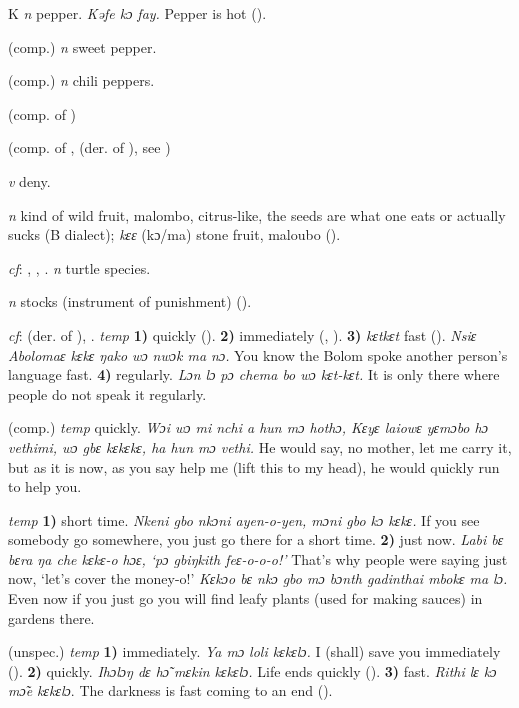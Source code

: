 \begin{letter}{K}
 \textit{n} pepper. \textit{Kəfe kɔ fay.} Pepper is hot (\citealt{Pichl1967}).

 (comp.) \textit{n} sweet pepper.

 (comp.) \textit{n} chili peppers.

 (comp. of ) 

 (comp. of ,  (der. of ), see ) 

 \textit{v} deny.

 \textit{n} kind of wild fruit, malombo, citrus-like, the seeds are what one eats or actually sucks (B dialect); \textit{kɛɛ} (kɔ/ma) stone fruit, maloubo (\citealt{Pichl1967}). 

 \textit{cf}: , , . \textit{n} turtle species.

 \textit{n} stocks (instrument of punishment) (\citealt{Pichl1967}).

 \textit{cf}:  (der. of ), . \textit{temp} \textbf{1)} quickly (\citealt{Pichl1967}). \textbf{2)} immediately (\citealt{Pichl1967}, \citealt{Sumner1921}). \textbf{3)} \textit{kɛtkɛt} fast (\citealt{Sumner1921}). \textit{Nsiɛ Abolomaɛ kɛkɛ ŋako wɔ nwɔk ma nɔ.} You know the Bolom spoke another person's language fast. \textbf{4)} regularly. \textit{Lɔn lɔ pɔ chema bo wɔ kɛt-kɛt.} It is only there where people do not speak it regularly.

 (comp.) \textit{temp} quickly. \textit{Wɔi wɔ mi nchi a hun mɔ hothɔ, Kɛyɛ laiowɛ yɛmɔbo hɔ vethimi, wɔ gbɛ kɛkɛkɛ, ha hun mɔ vethi.} He would say, no mother, let me carry it, but as it is now, as you say help me (lift this to my head), he would quickly run to help you.

 \textit{temp} \textbf{1)} short time. \textit{Nkeni gbo nkɔni ayen-o-yen, mɔni gbo kɔ kɛkɛ.} If you see somebody go somewhere, you just go there for a short time. \textbf{2)} just now. \textit{Labi bɛ bɛra ŋa che kɛkɛ-o hɔɛ, ‘pɔ gbiŋkith feɛ-o-o-o!'} That’s why people were saying just now, ‘let's cover the money-o!' \textit{Kɛkɔo bɛ nkɔ gbo mɔ bɔnth gadinthai mbokɛ ma lɔ.} Even now if you just go you will find leafy plants (used for making sauces) in gardens there.

 (unspec.) \textit{temp} \textbf{1)} immediately. \textit{Ya mɔ loli kɛkɛlɔ.} I (shall) save you immediately (\citealt{Pichl1967}). \textbf{2)} quickly. \textit{Ihɔlɔŋ dɛ hɔ̃ mɛkin kɛkɛlɔ.} Life ends quickly (\citealt{Pichl1967}). \textbf{3)} fast. \textit{Rithi lɛ kɔ mɔ̃e kɛkɛlɔ}. The darkness is fast coming to an end (\citealt{Pichl1967}). 


\end{letter}
